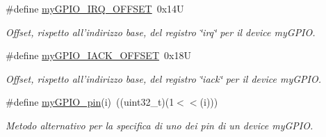 \begin{DoxyCompactItemize}
\#define \hyperlink{group__bare-metal_ga31a7c2a9de5c63576f2f5aa061b936c5}{my\+G\+P\+I\+O\+\_\+\+I\+R\+Q\+\_\+\+O\+F\+F\+S\+E\+T}~0x14\+U
\begin{DoxyCompactList}\small\item\em Offset, rispetto all'indirizzo base, del registro \char`\"{}irq\char`\"{} per il device my\+G\+P\+I\+O. \end{DoxyCompactList}\item 
\#define \hyperlink{group__bare-metal_gadfca866ac50c2dae09c3c46ad80670fc}{my\+G\+P\+I\+O\+\_\+\+I\+A\+C\+K\+\_\+\+O\+F\+F\+S\+E\+T}~0x18\+U
\begin{DoxyCompactList}\small\item\em Offset, rispetto all'indirizzo base, del registro \char`\"{}iack\char`\"{} per il device my\+G\+P\+I\+O. \end{DoxyCompactList}\item 
\#define \hyperlink{group__bare-metal_gabbe2491a3b71c292521025b7b382b971}{my\+G\+P\+I\+O\+\_\+pin}(i)~((uint32\+\_\+t)(1$<$$<$(i)))
\begin{DoxyCompactList}\small\item\em Metodo alternativo per la specifica di uno dei pin di un device my\+G\+P\+I\+O. \end{DoxyCompactList}\end{DoxyCompactItemize}
